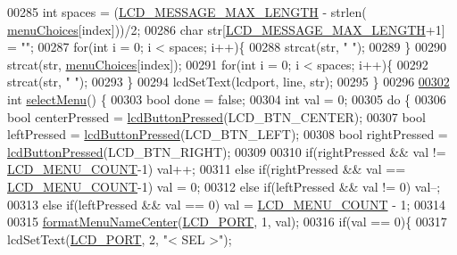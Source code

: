 \begin{DoxyCode}
00285     \textcolor{keywordtype}{int} spaces = (\hyperlink{lcdmsg_8h_abe4c4b70fc6f44ae3680e5b2c68cdd00}{LCD\_MESSAGE\_MAX\_LENGTH} - strlen(
      \hyperlink{lcddiag_8c_ab5b8edfc6a94520add858274b3fac974}{menuChoices}[index]))/2;
00286     \textcolor{keywordtype}{char} str[\hyperlink{lcdmsg_8h_abe4c4b70fc6f44ae3680e5b2c68cdd00}{LCD\_MESSAGE\_MAX\_LENGTH}+1] = \textcolor{stringliteral}{""};
00287     \textcolor{keywordflow}{for}(\textcolor{keywordtype}{int} i = 0; i < spaces; i++)\{
00288         strcat(str, \textcolor{stringliteral}{" "});
00289     \}
00290     strcat(str, \hyperlink{lcddiag_8c_ab5b8edfc6a94520add858274b3fac974}{menuChoices}[index]);
00291     \textcolor{keywordflow}{for}(\textcolor{keywordtype}{int} i = 0; i < spaces; i++)\{
00292         strcat(str, \textcolor{stringliteral}{" "});
00293     \}
00294     lcdSetText(lcdport, line, str);
00295 \}
00296 
\hypertarget{lcddiag_8c_source.tex_l00302}{}\hyperlink{lcddiag_8c_a1d2702d6508950416e4c927cc1ca18b3}{00302} \textcolor{keywordtype}{int} \hyperlink{lcddiag_8c_a1d2702d6508950416e4c927cc1ca18b3}{selectMenu}() \{
00303     \textcolor{keywordtype}{bool} done = \textcolor{keyword}{false};
00304     \textcolor{keywordtype}{int} val = 0;
00305     \textcolor{keywordflow}{do} \{
00306         \textcolor{keywordtype}{bool} centerPressed = \hyperlink{lcddiag_8h_a74e4c744db49f9b7b645095575e152ad}{lcdButtonPressed}(LCD\_BTN\_CENTER);
00307         \textcolor{keywordtype}{bool} leftPressed = \hyperlink{lcddiag_8h_a74e4c744db49f9b7b645095575e152ad}{lcdButtonPressed}(LCD\_BTN\_LEFT);
00308         \textcolor{keywordtype}{bool} rightPressed = \hyperlink{lcddiag_8h_a74e4c744db49f9b7b645095575e152ad}{lcdButtonPressed}(LCD\_BTN\_RIGHT);
00309 
00310         \textcolor{keywordflow}{if}(rightPressed && val != \hyperlink{lcddiag_8h_af08e03edfc50fa6a3af2555f9cce6e6c}{LCD\_MENU\_COUNT}-1) val++;
00311         \textcolor{keywordflow}{else} \textcolor{keywordflow}{if}(rightPressed && val == \hyperlink{lcddiag_8h_af08e03edfc50fa6a3af2555f9cce6e6c}{LCD\_MENU\_COUNT}-1) val = 0;
00312         \textcolor{keywordflow}{else} \textcolor{keywordflow}{if}(leftPressed && val != 0) val--;
00313         \textcolor{keywordflow}{else} \textcolor{keywordflow}{if}(leftPressed && val == 0) val = \hyperlink{lcddiag_8h_af08e03edfc50fa6a3af2555f9cce6e6c}{LCD\_MENU\_COUNT} - 1;
00314 
00315         \hyperlink{lcddiag_8c_a465a6cd66cde04199ae9641acce59d52}{formatMenuNameCenter}(\hyperlink{lcdmsg_8h_abcf42bd88b3c36193f301ca25b033875}{LCD\_PORT}, 1, val);
00316         \textcolor{keywordflow}{if}(val == 0)\{
00317             lcdSetText(\hyperlink{lcdmsg_8h_abcf42bd88b3c36193f301ca25b033875}{LCD\_PORT}, 2, \textcolor{stringliteral}{"<      SEL     >"});

\end{DoxyCode}
